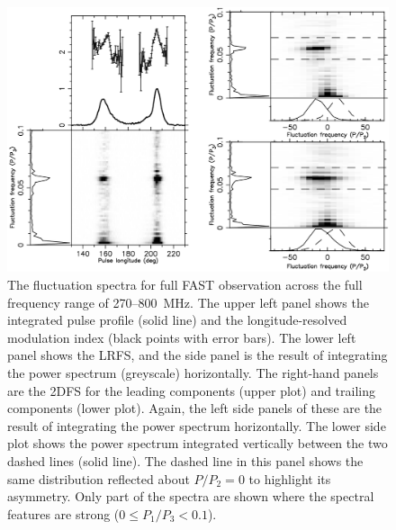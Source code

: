 \begin{figure}
    \begin{center}
        \includegraphics[width=1.0\textwidth]{Figures/J1926/fluctuation_spectra}
        \caption[LRFS and 2DFS of PSR~J1926$-$0652]{The fluctuation spectra for full FAST observation across the full frequency range of 270--800~MHz. The upper left panel shows the integrated pulse profile (solid line) and the longitude-resolved modulation index (black points with error bars). The lower left panel shows the LRFS, and the side panel is the result of integrating the power spectrum (greyscale) horizontally. The right-hand panels are the 2DFS for the leading components (upper plot) and trailing components (lower plot). Again, the left side panels of these are the result of integrating the power spectrum horizontally. The lower side plot shows the power spectrum integrated vertically between the two dashed lines (solid line). The dashed line in this panel shows the same distribution reflected about $P/P_2 = 0$ to highlight its asymmetry. Only part of the spectra are shown where the spectral features are strong ($0 \leq P_1/P_3 < 0.1$).}
        \label{fig: J1926 - fluctuation spectra}
    \end{center}
\end{figure}


